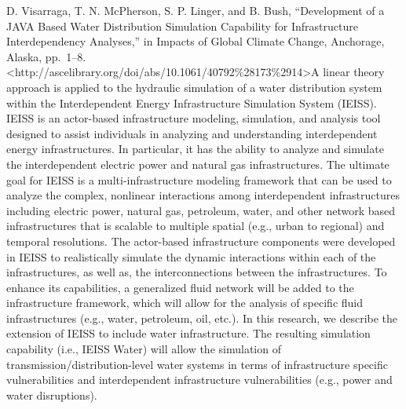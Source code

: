 \documentclass[]{article}
\begin{document}
D. Visarraga, T. N. McPherson, S. P. Linger, and B. Bush, ``Development
of a JAVA Based Water Distribution Simulation Capability for
Infrastructure Interdependency Analyses,'' in Impacts of Global Climate
Change, Anchorage, Alaska, pp.~1--8.
\textless{}http://ascelibrary.org/doi/abs/10.1061/40792\%28173\%2914\textgreater{}A
linear theory approach is applied to the hydraulic simulation of a water
distribution system within the Interdependent Energy Infrastructure
Simulation System (IEISS). IEISS is an actor-based infrastructure
modeling, simulation, and analysis tool designed to assist individuals
in analyzing and understanding interdependent energy infrastructures. In
particular, it has the ability to analyze and simulate the
interdependent electric power and natural gas infrastructures. The
ultimate goal for IEISS is a multi-infrastructure modeling framework
that can be used to analyze the complex, nonlinear interactions among
interdependent infrastructures including electric power, natural gas,
petroleum, water, and other network based infrastructures that is
scalable to multiple spatial (e.g., urban to regional) and temporal
resolutions. The actor-based infrastructure components were developed in
IEISS to realistically simulate the dynamic interactions within each of
the infrastructures, as well as, the interconnections between the
infrastructures. To enhance its capabilities, a generalized fluid
network will be added to the infrastructure framework, which will allow
for the analysis of specific fluid infrastructures (e.g., water,
petroleum, oil, etc.). In this research, we describe the extension of
IEISS to include water infrastructure. The resulting simulation
capability (i.e., IEISS Water) will allow the simulation of
transmission/distribution-level water systems in terms of infrastructure
specific vulnerabilities and interdependent infrastructure
vulnerabilities (e.g., power and water disruptions).
\end{document}
